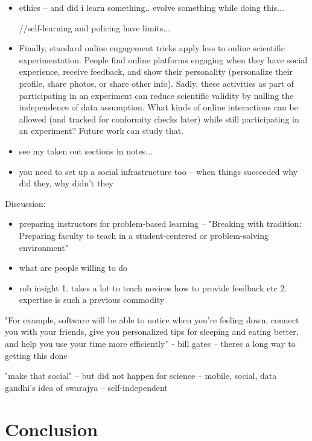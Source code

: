 \begin{itemize}
\item ethics -- and did i learn something.. evolve something while doing this...

//self-learning and policing have limits...

\item Finally, standard online engagement tricks apply less to online scientific experimentation. People find online platforms engaging when they have social experience, receive feedback, and show their personality (personalize their profile, share photos, or share other info). Sadly, these activities as part of participating in an experiment can reduce scientific validity by nulling the independence of data assumption. What kinds of online interactions can be allowed (and tracked for conformity checks later) while still participating in an experiment? Future work can study that.
\item see my taken out sections in notes...

\item you need to set up a social infrastructure too -- when things succeeded why did they, why didn't they

\end{itemize}

Discussion: 
\begin{itemize}
\item preparing instructors for problem-based learning -- "Breaking with tradition: Preparing faculty to teach in a student-centered or problem-solving environment"
\item what are people willing to do 
\item rob insight
1. takes a lot to teach novices how to provide feedback etc 
2. expertise is such a previous commodity
\end{itemize}

"For example, software will be able to notice when you’re feeling down, connect you with your friends, give you personalized tips for sleeping and eating better, and help you use your time more efficiently” - bill gates -- theres a long way to getting this done

"make that social" -- but did not happen for science -- mobile, social, data
gandhi’s idea of swarajya -- self-independent 




\chapter{Conclusion}

